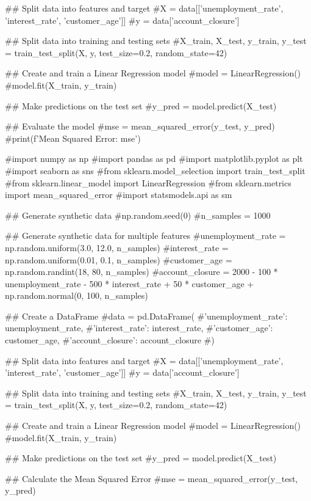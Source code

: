## Split data into features and target
#X = data[['unemployment_rate', 'interest_rate', 'customer_age']]
#y = data['account_closure']

## Split data into training and testing sets
#X_train, X_test, y_train, y_test = train_test_split(X, y, test_size=0.2, random_state=42)

## Create and train a Linear Regression model
#model = LinearRegression()
#model.fit(X_train, y_train)

## Make predictions on the test set
#y_pred = model.predict(X_test)

## Evaluate the model
#mse = mean_squared_error(y_test, y_pred)
#print(f'Mean Squared Error: {mse}')





#import numpy as np
#import pandas as pd
#import matplotlib.pyplot as plt
#import seaborn as sns
#from sklearn.model_selection import train_test_split
#from sklearn.linear_model import LinearRegression
#from sklearn.metrics import mean_squared_error
#import statsmodels.api as sm

## Generate synthetic data
#np.random.seed(0)
#n_samples = 1000

## Generate synthetic data for multiple features
#unemployment_rate = np.random.uniform(3.0, 12.0, n_samples)
#interest_rate = np.random.uniform(0.01, 0.1, n_samples)
#customer_age = np.random.randint(18, 80, n_samples)
#account_closure = 2000 - 100 * unemployment_rate - 500 * interest_rate + 50 * customer_age + np.random.normal(0, 100, n_samples)

## Create a DataFrame
#data = pd.DataFrame({
    #'unemployment_rate': unemployment_rate,
    #'interest_rate': interest_rate,
    #'customer_age': customer_age,
    #'account_closure': account_closure
#})

## Split data into features and target
#X = data[['unemployment_rate', 'interest_rate', 'customer_age']]
#y = data['account_closure']

## Split data into training and testing sets
#X_train, X_test, y_train, y_test = train_test_split(X, y, test_size=0.2, random_state=42)

## Create and train a Linear Regression model
#model = LinearRegression()
#model.fit(X_train, y_train)

## Make predictions on the test set
#y_pred = model.predict(X_test)

## Calculate the Mean Squared Error
#mse = mean_squared_error(y_test, y_pred)

